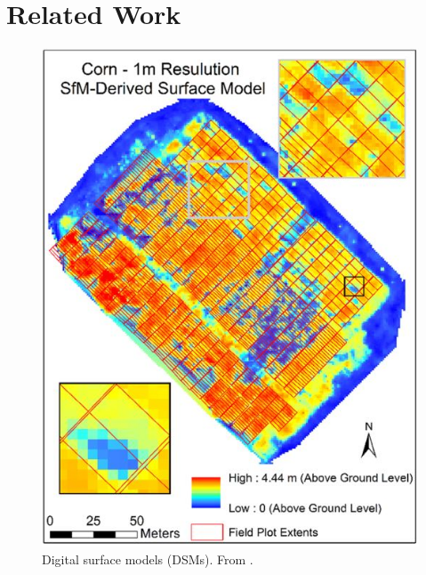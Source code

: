 \section{Related Work}
\label{sec:related_work}

\begin{figure}[t]
    \includegraphics[width=\linewidth]{../images/DSM} 
    \caption{Digital surface models (DSMs). From \cite{UAV_HTPAR_2016}.}
    \label{fig:DSM}
\end{figure}


